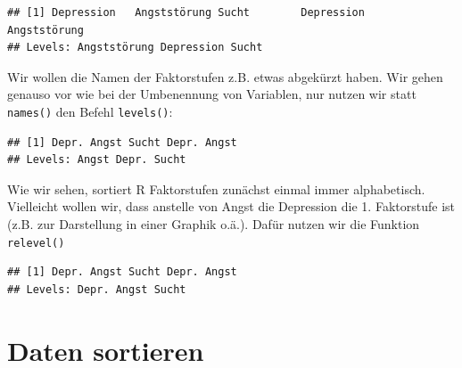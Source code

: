 \documentclass[
]{book}
\newenvironment{Shaded}{\begin{snugshade}}{\end{snugshade}}
\newcommand{\FunctionTok}[1]{\textcolor[rgb]{0.00,0.00,0.00}{#1}}
\newcommand{\NormalTok}[1]{#1}
\newcommand{\OtherTok}[1]{\textcolor[rgb]{0.56,0.35,0.01}{#1}}
\newcommand{\SpecialCharTok}[1]{\textcolor[rgb]{0.00,0.00,0.00}{#1}}
\newcommand{\StringTok}[1]{\textcolor[rgb]{0.31,0.60,0.02}{#1}}
\begin{document}
\begin{verbatim}
## [1] Depression   Angststörung Sucht        Depression   Angststörung
## Levels: Angststörung Depression Sucht
\end{verbatim}

Wir wollen die Namen der Faktorstufen z.B. etwas abgekürzt haben. Wir gehen genauso vor wie bei der Umbenennung von Variablen, nur nutzen wir statt \texttt{names()} den Befehl \texttt{levels()}:

\begin{Shaded}
\end{Shaded}

\begin{verbatim}
## [1] Depr. Angst Sucht Depr. Angst
## Levels: Angst Depr. Sucht
\end{verbatim}

Wie wir sehen, sortiert R Faktorstufen zunächst einmal immer alphabetisch. Vielleicht wollen wir, dass anstelle von Angst die Depression die 1. Faktorstufe ist (z.B. zur Darstellung in einer Graphik o.ä.). Dafür nutzen wir die Funktion \texttt{relevel()}

\begin{Shaded}
\end{Shaded}

\begin{verbatim}
## [1] Depr. Angst Sucht Depr. Angst
## Levels: Depr. Angst Sucht
\end{verbatim}

\hypertarget{daten-sortieren}{%
\section{Daten sortieren}\label{daten-sortieren}}
\end{document}
